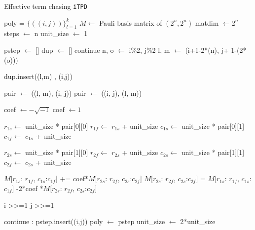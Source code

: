 \documentclass[twocolumn]{article}
\begin{document}
\begin{algorithm}
    \caption{Effective term chasing \texttt{iTPD}}\label{alg:effective_terms}
    \begin{algorithmic}
        \Require poly = $\{((i, j))\}_{l=1}^k$ 
        \Require $M \gets$ Pauli basis matrix of $(2^n, 2^n)$
        \State matdim $\gets 2^n$
        \State steps $\gets$ n
        \State unit\_size $\gets$ 1
        
            \State pstep $\gets$ [] 
            \State dup   $\gets$ []
                    continue
                \EndIf
                \State n, o $\gets$ i\%2, j\%2  
                \State l, m $\gets$ (i+1-2*(n), j+ 1-(2*(o))) 
                
                \State dup.insert((l,m) , (i,j))
                
                    \State pair $\gets$ ((l, m), (i, j))
                \Else
                    \State pair $\gets$ ((i, j), (l, m))
                \EndIf

                    \State coef $\gets - \sqrt{-1}$ 
                \Else
                    \State coef $\gets 1$
                \EndIf

                \State $r_{1s}\gets$ unit\_size * pair[0][0]
                \State $r_{1f}\gets$ $r_{1s}$ + unit\_size
                \State $c_{1s}\gets$ unit\_size * pair[0][1]
                \State $c_{1f}\gets$ $c_{1s}$ + unit\_size

                \State $r_{2s}\gets$ unit\_size * pair[1][0]
                \State $r_{2f}\gets$ $r_{2s}$ + unit\_size
                \State $c_{2s}\gets$ unit\_size * pair[1][1]
                \State $c_{2f}\gets$ $c_{2s}$ + unit\_size

                \State $M$[$r_{1s}$: $r_{1f}$, $c_{1s}$:$c_{1f}$] += coef*$M$[$r_{2s}$: $r_{2f}$, $c_{2s}$:$c_{2f}$]
                \State $M$[$r_{2s}$: $r_{2f}$, $c_{2s}$:$c_{2f}$] = $M$[$r_{1s}$: $r_{1f}$, $c_{1s}$:$c_{1f}$] -2*coef *$M$[$r_{2s}$: $r_{2f}$, $c_{2s}$:$c_{2f}$]

                \State i >>=1 
                \State j >>=1

                    continue
                \Else:
                    pstep.insert((i,j))
                \EndIf
            \EndFor
            \State poly $\gets$ pstep
            \State unit\_size $\gets$ 2*unit\_size
        \EndFor
    \end{algorithmic}
\end{algorithm}
\end{document}
